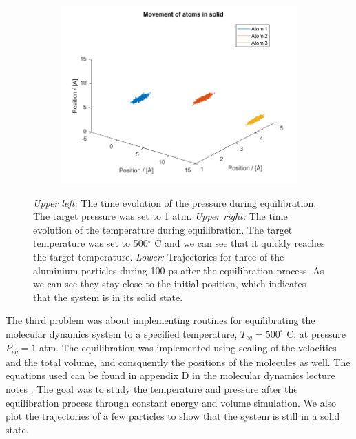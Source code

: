 \begin{figure}[H]
\begin{subfigure}[b]{0.40\textwidth}
    \end{subfigure}
    \begin{subfigure}[b]{0.40\textwidth}
        \centering
        \includegraphics[width=\textwidth]{graphics/task3/traj.png}
    \end{subfigure}
    \caption{\textit{Upper left:} The time evolution of the pressure during equilibration. The target pressure was set to 1 atm. \textit{Upper right:} The time evolution of the temperature during equilibration. The target temperature was set to 500$^\circ$ C and we can see that it quickly reaches the target temperature. \textit{Lower:} Trajectories for three of the aluminium particles during 100 ps after the equilibration process. As we can see they stay close to the initial position, which indicates that the system is in its solid state.}
    \label{fig:equilibrium500}
\end{figure}

The third problem was about implementing routines for equilibrating the molecular dynamics system to a specified temperature, $T_{eq} = 500^\circ$ C, at pressure $P_{eq} = 1$ atm. The equilibration was implemented using scaling of the velocities and the total volume, and consquently the positions of the molecules as well. The equations used can be found in appendix D in the molecular dynamics lecture notes \cite{lecnotes}. The goal was to study the temperature and pressure after the equilibration process through constant energy and volume simulation. We also plot the trajectories of a few particles to show that the system is still in a solid state.

